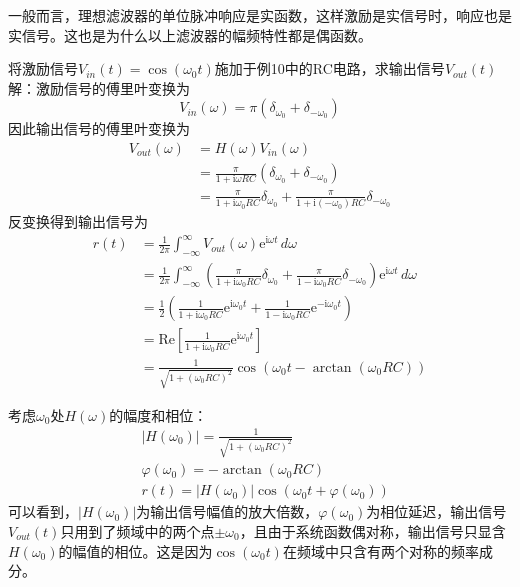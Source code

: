 \documentclass{ctexbook}
\begin{document}
一般而言，理想滤波器的单位脉冲响应是实函数，这样激励是实信号时，响应也是实信号。这也是为什么以上滤波器的幅频特性都是偶函数。
\begin{example}
将激励信号$V_{in}(t)=\cos(\omega_0 t)$施加于例10中的RC电路，求输出信号$V_{out}(t)$\\
解：激励信号的傅里叶变换为
    \[V_{in}(\omega)=\pi(\delta_{\omega_0}+\delta_{-\omega_0})\]
因此输出信号的傅里叶变换为
\begin{align*}
    V_{out}(\omega)&=H(\omega)V_{in}(\omega)\\
    &=\frac{\pi}{1+\mathrm{i}\omega RC}(\delta_{\omega_0}+\delta_{-\omega_0})\\
    &=\frac{\pi}{1+\mathrm{i}\omega_0 RC}\delta_{\omega_0}+\frac{\pi}{1+\mathrm{i}(-\omega_0) RC}\delta_{-\omega_0}
\end{align*}
反变换得到输出信号为
\begin{align*}
    r(t)&=\frac{1}{2\pi}\int_{-\infty}^{\infty}V_{out}(\omega)\mathrm{e}^{\mathrm{i}\omega t}\,d\omega\\
    &=\frac{1}{2\pi}\int_{-\infty}^{\infty}\left(\frac{\pi}{1+\mathrm{i}\omega_0 RC}\delta_{\omega_0}+\frac{\pi}{1-\mathrm{i}\omega_0 RC}\delta_{-\omega_0}\right)\mathrm{e}^{\mathrm{i}\omega t}\,d\omega\\
    &=\frac{1}{2}\left(\frac{1}{1+\mathrm{i}\omega_0 RC}\mathrm{e}^{\mathrm{i}\omega_0 t}+\frac{1}{1-\mathrm{i}\omega_0 RC}\mathrm{e}^{-\mathrm{i}\omega_0 t}\right)\\
    &=\text{Re}\left[\frac{1}{1+\mathrm{i}\omega_0 RC}\mathrm{e}^{\mathrm{i}\omega_0 t}\right]\\
    &=\frac{1}{\sqrt{1+(\omega_0 RC)^2}}\cos(\omega_0 t-\arctan(\omega_0 RC))
\end{align*}

考虑$\omega_0$处$H(\omega)$的幅度和相位：
\begin{align*}
    &|H(\omega_0)|=\frac{1}{\sqrt{1+(\omega_0 RC)^2}}\\
    &\varphi(\omega_0)=-\arctan(\omega_0 RC)\\
    &r(t)=\left|H(\omega_0)\right|\cos\left(\omega_0 t+\varphi(\omega_0)\right)
\end{align*}
可以看到，$|H(\omega_0)|$为输出信号幅值的放大倍数，$\varphi(\omega_0)$为相位延迟，输出信号$V_{out}(t)$只用到了频域中的两个点$\pm\omega_0$，且由于系统函数偶对称，输出信号只显含$H(\omega_0)$的幅值的相位。这是因为$\cos(\omega_0 t)$在频域中只含有两个对称的频率成分。
\end{example}
\end{document}
